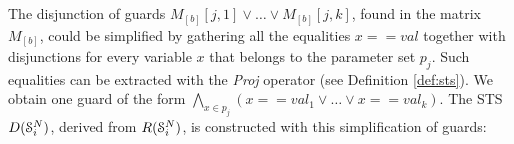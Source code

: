 %
%
%
%
%

The disjunction of guards $M_{[b]}[j,1] \vee \dots \vee
M_{[b]}[j,k]$, found in the matrix $M_{[b]}$, could be simplified
by gathering all the equalities $x==val$ together with
disjunctions for every variable $x$ that belongs to the parameter
set $p_j$. Such equalities can be extracted with the
\textit{Proj} operator (see Definition \ref{def:sts}). We
obtain one guard of the form $\bigwedge_{x \in p_j}(x==val_1 \vee
\dots \vee x==val_k)$. The STS $D(\EuScript{S}_i^{N})$, derived
from $R(\EuScript{S}_i^{N})$, is constructed with this
simplification of guards:


